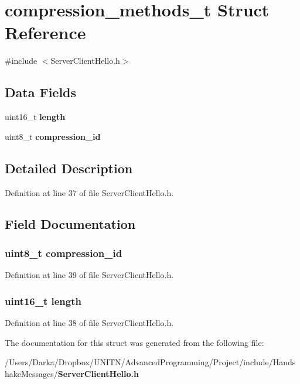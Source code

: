 \section{compression\+\_\+methods\+\_\+t Struct Reference}
\label{structcompression__methods__t}


{\ttfamily \#include $<$Server\+Client\+Hello.\+h$>$}

\subsection*{Data Fields}
\begin{DoxyCompactItemize}
\item 
uint16\+\_\+t {\bf length}
\item 
uint8\+\_\+t {\bf compression\+\_\+id}
\end{DoxyCompactItemize}


\subsection{Detailed Description}


Definition at line 37 of file Server\+Client\+Hello.\+h.



\subsection{Field Documentation}
\subsubsection[{compression\+\_\+id}]{\setlength{\rightskip}{0pt plus 5cm}uint8\+\_\+t compression\+\_\+id}\label{structcompression__methods__t_a7ef978ebc39692d395c5310e1a0e92d5}


Definition at line 39 of file Server\+Client\+Hello.\+h.

\subsubsection[{length}]{\setlength{\rightskip}{0pt plus 5cm}uint16\+\_\+t length}\label{structcompression__methods__t_a1892eba2086d12ac2b09005aeb09ea3b}


Definition at line 38 of file Server\+Client\+Hello.\+h.



The documentation for this struct was generated from the following file\+:\begin{DoxyCompactItemize}
\item 
/\+Users/\+Darka/\+Dropbox/\+U\+N\+I\+T\+N/\+Advanced\+Programming/\+Project/include/\+Handshake\+Messages/{\bf Server\+Client\+Hello.\+h}\end{DoxyCompactItemize}
